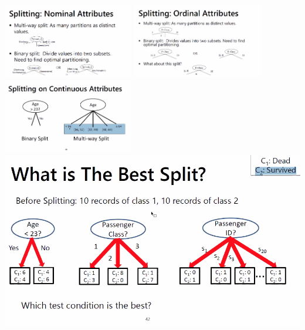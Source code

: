 \documentclass[12pt]{article}
\begin{document}
\begin{itemize}
			{\centering 
			\includegraphics[width=2.25in]{splitnom.png}
			\includegraphics[width=2.25in]{splitord.png}
			\includegraphics[width=2.25in]{splitcontinuous.png}
			\newline \newline
			\includegraphics[scale=.45]{bestsplit.png}}
			

\end{itemize}
\end{document}
